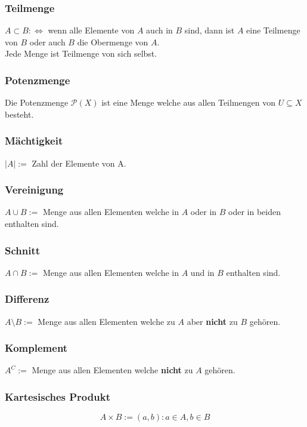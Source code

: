 \documentclass[12pt]{article}
\begin{document}
\subsubsection{Teilmenge}
$A \subset B:\Leftrightarrow$ wenn alle Elemente von $A$ auch in $B$ sind, dann ist $A$ eine Teilmenge von $B$ oder auch $B$ die Obermenge von $A$.\\
Jede Menge ist Teilmenge von sich selbst. 
\subsubsection{Potenzmenge}
Die Potenzmenge $\mathcal{P}(X)$ ist eine Menge welche aus allen Teilmengen von $U \subseteq X$ besteht.
\subsubsection{Mächtigkeit}
$|A|:=$ Zahl der Elemente von A.
\subsubsection{Vereinigung}
$A\cup B:=$ Menge aus allen Elementen welche in $A$ oder in $B$ oder in beiden enthalten sind.
\subsubsection{Schnitt}
$A\cap B:=$ Menge aus allen Elementen welche in $A$ und in $B$ enthalten sind.
\subsubsection{Differenz}
$A\setminus B:=$ Menge aus allen Elementen welche zu $A$ aber \textbf{nicht} zu $B$ gehören.
\subsubsection{Komplement}
$A^C:=$ Menge aus allen Elementen welche \textbf{nicht} zu $A$ gehören.
\subsubsection{Kartesisches Produkt}
\begin{equation*}
	A \times B:={(a, b):a\in A, b\in B}
\end{equation*}
\end{document}
